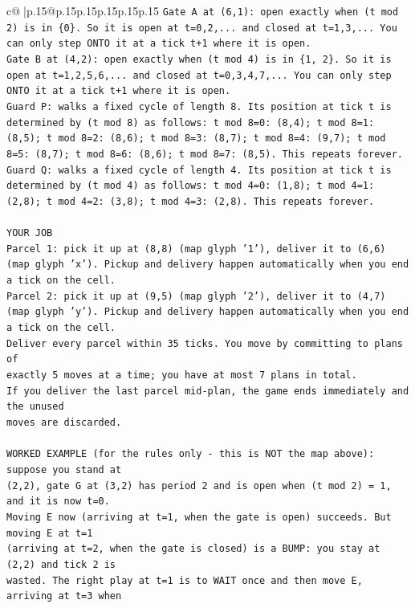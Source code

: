 \documentclass{article}
\begin{document}
{\begin{supertabular}{c@{$\;$}|p{.15\linewidth}@{}p{.15\linewidth}p{.15\linewidth}p{.15\linewidth}p{.15\linewidth}p{.15\linewidth}}
{{{\texttt{Gate A at (6,1): open exactly when (t mod 2) is in \{0\}. So it is open at t=0,2,... and closed at t=1,3,... You can only step ONTO it at a tick t+1 where it is open.} \\
\texttt{Gate B at (4,2): open exactly when (t mod 4) is in \{1, 2\}. So it is open at t=1,2,5,6,... and closed at t=0,3,4,7,... You can only step ONTO it at a tick t+1 where it is open.} \\
\texttt{Guard P: walks a fixed cycle of length 8. Its position at tick t is determined by (t mod 8) as follows: t mod 8=0: (8,4); t mod 8=1: (8,5); t mod 8=2: (8,6); t mod 8=3: (8,7); t mod 8=4: (9,7); t mod 8=5: (8,7); t mod 8=6: (8,6); t mod 8=7: (8,5). This repeats forever.} \\
\texttt{Guard Q: walks a fixed cycle of length 4. Its position at tick t is determined by (t mod 4) as follows: t mod 4=0: (1,8); t mod 4=1: (2,8); t mod 4=2: (3,8); t mod 4=3: (2,8). This repeats forever.} \\
\\ 
\texttt{YOUR JOB} \\
\texttt{Parcel 1: pick it up at (8,8) (map glyph '1'), deliver it to (6,6) (map glyph 'x'). Pickup and delivery happen automatically when you end a tick on the cell.} \\
\texttt{Parcel 2: pick it up at (9,5) (map glyph '2'), deliver it to (4,7) (map glyph 'y'). Pickup and delivery happen automatically when you end a tick on the cell.} \\
\texttt{Deliver every parcel within 35 ticks. You move by committing to plans of} \\
\texttt{exactly 5 moves at a time; you have at most 7 plans in total.} \\
\texttt{If you deliver the last parcel mid{-}plan, the game ends immediately and the unused} \\
\texttt{moves are discarded.} \\
\\ 
\texttt{WORKED EXAMPLE (for the rules only {-} this is NOT the map above): suppose you stand at} \\
\texttt{(2,2), gate G at (3,2) has period 2 and is open when (t mod 2) = 1, and it is now t=0.} \\
\texttt{Moving E now (arriving at t=1, when the gate is open) succeeds. But moving E at t=1} \\
\texttt{(arriving at t=2, when the gate is closed) is a BUMP: you stay at (2,2) and tick 2 is} \\
\texttt{wasted. The right play at t=1 is to WAIT once and then move E, arriving at t=3 when} \\
}}}
\end{supertabular}}
\end{document}
